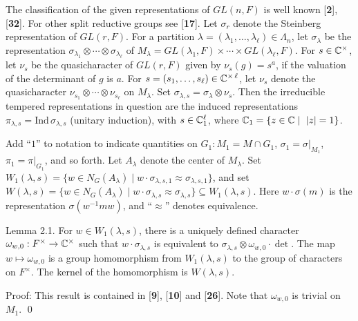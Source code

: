 \documentclass{amsart}
\begin{document}
The classification of the given representations of $ GL (n,F) $
is well known [{\bf 2}], [{\bf 32}].  For other split reductive
groups see [{\bf 17}].  Let $\sigma_r$ denote the Steinberg
representation of $GL(r,F)$.  For a partition 
$\lambda=(\lambda_1,\ldots,\lambda_\ell)\in\Lambda_n$, let
$\sigma_\lambda$ be the representation $\sigma_{\lambda_1}\otimes
\cdots\otimes\sigma_{\lambda_\ell}$ of $M_\lambda  = 
GL(\lambda_1,F)\times \cdots\times GL(\lambda_\ell,F)$.  For
$s\in {\Bbb C}^\times$, let $\nu_s$ be the quasicharacter of
$GL(r,F)$ given by $\nu_s(g) = s^a$, if the valuation of the determinant
of $g$ is $a$.  For $s=(s_1,\ldots,s_\ell)\in {\Bbb C}^{\times\,\ell}$, let
$\nu_s$ denote the quasicharacter $\nu_{s_1}\otimes\cdots\otimes
\nu_{s_\ell}$ on $M_\lambda$.  Set $\sigma_{\lambda,s}=\sigma_\lambda
\otimes \nu_s$.  Then the irreducible tempered representations 
in question are the induced representations 
$\pi_{\lambda,s} = \text{Ind}\,\sigma_{\lambda,s}$ (unitary
induction), with $s\in {\Bbb C}_1^\ell$, where ${\Bbb C_1}= \{z\in {\Bbb C}\mid
\ |z|=1\}$.

Add ``$1$'' to notation to indicate quantities on 
  $ G_1 : M_1 = M \cap G_1$,
  $ \sigma_1 = \sigma \big|_{M_1} $,
  $ \pi_1 = \pi \big|_{G_1} $, and so forth.
Let $A_\lambda$ denote the center of $M_\lambda$.
Set
  $ W_1 (\lambda,s) =
    \{ w \in N_G(A_{\lambda}) \mid
       w \cdot \sigma_{\lambda,s,1} \approx
       \sigma_{\lambda,s,1} 
    \} $,
and set
  $ W(\lambda,s) =
   \{ w \in N_G(A_{\lambda}) \mid
       w \cdot \sigma_{\lambda,s} \approx
       \sigma_{\lambda,s} 
    \} \subseteq W_1(\lambda,s) $.
Here
  $ w \cdot \sigma (m)$ is the representation  $ \sigma(w^{-1} mw) $,
  and ``$\approx$'' denotes equivalence.

\proclaim Lemma {2.1}.
For
  $ w \in W_1(\lambda,s) $,
there is a uniquely defined character
  $ \omega_{w,0}: F^{\times} \to {\Bbb C}^{\times} $
such that
  $ w \cdot \sigma_{\lambda,s} $ is equivalent to
   $\sigma_{\lambda,s} \otimes
   \omega_{w,0} \cdot \det $.
The map
  $ w \mapsto \omega_{w,0} $
is a group homomorphism from 
  $ W_1(\lambda,s) $
to the group of characters on 
  $ F^{\times} $.
The kernel of the homomorphism is
  $ W(\lambda,s) $.
\finishproclaim

\pproclaim Proof: This result is contained in {\rm [{\bf 9}], [{\bf 10}] and [{\bf 26}]}.
Note that
  $ \omega_{w,0} $
is trivial on
  $ M_1 $.
%
\qed
\finishpproclaim
\end{document}
